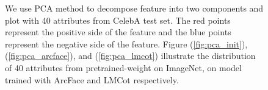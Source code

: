 \begin{figure}
    \centering
    \qquad
     \quad 
    \caption{We use PCA method to decompose feature into two components and plot with 40 attributes from CelebA test set. The red points represent the positive side of the feature and the blue points represent the negative side of the feature. Figure (\ref{fig:pca_init}), (\ref{fig:pca_arcface}), and (\ref{fig:pca_lmcot}) illustrate the distribution of 40 attributes from pretrained-weight on ImageNet, on model trained with ArcFace and LMCot respectively.}
    \label{figure04}
\end{figure}

